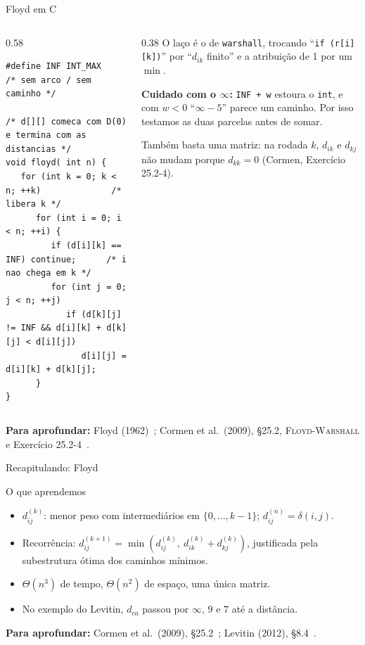 \documentclass[aspectratio=169,xcolor=table]{beamer}
\newcommand{\fonte}[1]{%
  \vfill
  {\tiny\color{gray!55!black}\textbf{Para aprofundar:} #1\par}%
}
\begin{document}
\begin{frame}[fragile]{Floyd em C}
  \begin{columns}[T]
    \begin{column}{0.58\textwidth}
\begin{lstlisting}[basicstyle=\ttfamily\tiny]
#define INF INT_MAX     /* sem arco / sem caminho */

/* d[][] comeca com D(0) e termina com as distancias */
void floyd( int n) {
   for (int k = 0; k < n; ++k)              /* libera k */
      for (int i = 0; i < n; ++i) {
         if (d[i][k] == INF) continue;      /* i nao chega em k */
         for (int j = 0; j < n; ++j)
            if (d[k][j] != INF && d[i][k] + d[k][j] < d[i][j])
               d[i][j] = d[i][k] + d[k][j];
      }
}
\end{lstlisting}
    \end{column}
    \begin{column}{0.38\textwidth}
      \scriptsize O laço é o de \texttt{warshall}, trocando ``\texttt{if (r[i][k])}'' por
      ``$d_{ik}$ finito'' e a atribuição de 1 por um $\min$.
      \medskip

      \textbf{Cuidado com o $\infty$:} \texttt{INF + w} estoura o \texttt{int}, e com
      $w < 0$ ``$\infty - 5$'' parece um caminho. Por isso testamos as duas parcelas antes de
      somar.
      \medskip

      Também basta uma matriz: na rodada $k$, $d_{ik}$ e $d_{kj}$ não mudam porque
      $d_{kk} = 0$ (Cormen, Exercício 25.2-4).
    \end{column}
  \end{columns}
  \fonte{Floyd (1962)~\cite{floyd1962algorithm}; Cormen et al.\ (2009), \S 25.2,
    \textsc{Floyd-Warshall} e Exercício 25.2-4~\cite{cormen2009introduction}.}
\end{frame}

\begin{frame}{Recapitulando: Floyd}
  \begin{block}{O que aprendemos}
    \begin{itemize}\scriptsize
      \item $d^{(k)}_{ij}$: menor peso com intermediários em $\{0,\dots,k-1\}$;
            $d^{(n)}_{ij} = \delta(i,j)$.
      \item Recorrência: $d^{(k+1)}_{ij} = \min(d^{(k)}_{ij},\ d^{(k)}_{ik} + d^{(k)}_{kj})$,
            justificada pela subestrutura ótima dos caminhos mínimos.
      \item $\Theta(n^3)$ de tempo, $\Theta(n^2)$ de espaço, uma única matriz.
      \item No exemplo do Levitin, $d_{ca}$ passou por $\infty$, $9$ e $7$ até a distância.
    \end{itemize}
  \end{block}
  \fonte{Cormen et al.\ (2009), \S 25.2~\cite{cormen2009introduction};
    Levitin (2012), \S 8.4~\cite{levitin2012introduction}.}
\end{frame}
\end{document}

